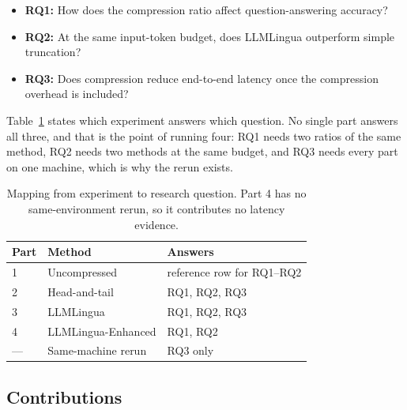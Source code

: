 ﻿\documentclass[10pt,a4paper,twocolumn]{article}
\begin{document}
\begin{itemize}
    \item \textbf{RQ1:} How does the compression ratio affect question-answering
    accuracy?
    \item \textbf{RQ2:} At the same input-token budget, does LLMLingua outperform
    simple truncation?
    \item \textbf{RQ3:} Does compression reduce end-to-end latency once the
    compression overhead is included?
\end{itemize}

Table~\ref{tab:map} states which experiment answers which question. No single
part answers all three, and that is the point of running four: RQ1 needs two
ratios of the same method, RQ2 needs two methods at the same budget, and RQ3
needs every part on one machine, which is why the rerun exists.

\begin{table}[t]
\centering
\footnotesize
\begin{tabularx}{\columnwidth}{@{}llX@{}}
\toprule
Part & Method & Answers \\
\midrule
1 & Uncompressed        & reference row for RQ1--RQ2 \\[1pt]
2 & Head-and-tail       & RQ1, RQ2, RQ3 \\[1pt]
3 & LLMLingua           & RQ1, RQ2, RQ3 \\[1pt]
4 & LLMLingua-Enhanced  & RQ1, RQ2 \\[1pt]
--- & Same-machine rerun & RQ3 only \\
\bottomrule
\end{tabularx}
\caption{Mapping from experiment to research question. Part 4 has no
same-environment rerun, so it contributes no latency evidence.}
\label{tab:map}
\end{table}

\subsection{Contributions}
\end{document}
